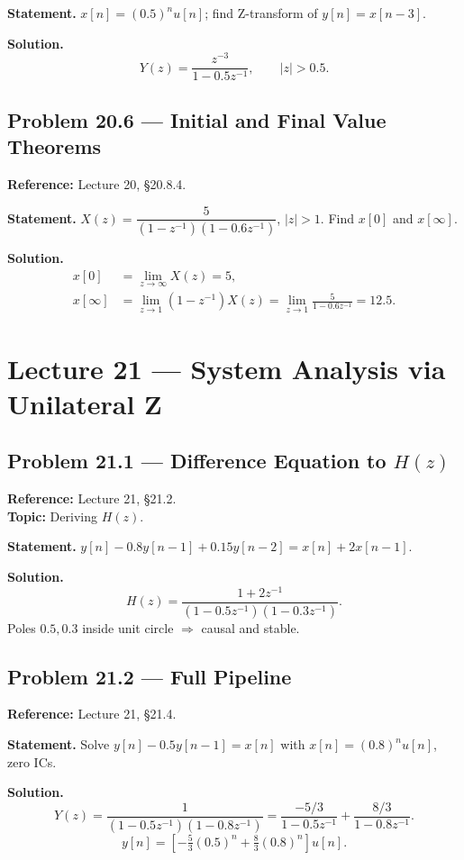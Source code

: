 \documentclass[11pt]{article}
\begin{document}
\textbf{Statement.} $x[n]=(0.5)^n u[n]$; find Z-transform of $y[n]=x[n-3]$.

\textbf{Solution.}
\[
Y(z) = \frac{z^{-3}}{1-0.5z^{-1}},\qquad |z|>0.5.
\]

\subsection{Problem 20.6 --- Initial and Final Value Theorems}
\textbf{Reference:} Lecture 20, \S 20.8.4.

\textbf{Statement.} $X(z) = \dfrac{5}{(1-z^{-1})(1-0.6z^{-1})}$, $|z|>1$. Find $x[0]$ and $x[\infty]$.

\textbf{Solution.}
\begin{align*}
x[0] &= \lim_{z\to\infty}X(z) = 5,\\
x[\infty] &= \lim_{z\to 1}(1-z^{-1})X(z) = \lim_{z\to 1}\frac{5}{1-0.6z^{-1}} = 12.5.
\end{align*}

\section{Lecture 21 --- System Analysis via Unilateral Z}

\subsection{Problem 21.1 --- Difference Equation to $H(z)$}
\textbf{Reference:} Lecture 21, \S 21.2.\\
\textbf{Topic:} Deriving $H(z)$.

\textbf{Statement.} $y[n]-0.8y[n-1]+0.15y[n-2] = x[n]+2x[n-1]$.

\textbf{Solution.}
\[
H(z) = \frac{1+2z^{-1}}{(1-0.5z^{-1})(1-0.3z^{-1})}.
\]
Poles $0.5,0.3$ inside unit circle $\Rightarrow$ causal and stable.

\subsection{Problem 21.2 --- Full Pipeline}
\textbf{Reference:} Lecture 21, \S 21.4.

\textbf{Statement.} Solve $y[n] - 0.5 y[n-1] = x[n]$ with $x[n]=(0.8)^n u[n]$, zero ICs.

\textbf{Solution.}
\[
Y(z) = \frac{1}{(1-0.5z^{-1})(1-0.8z^{-1})} = \frac{-5/3}{1-0.5z^{-1}}+\frac{8/3}{1-0.8z^{-1}}.
\]
\[
\boxed{y[n] = \left[-\tfrac{5}{3}(0.5)^n + \tfrac{8}{3}(0.8)^n\right]u[n]}.
\]
\end{document}
